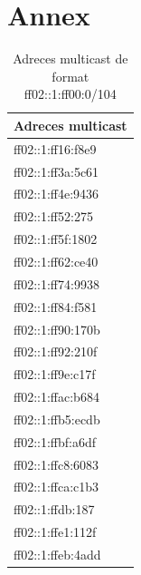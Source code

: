 \documentclass{article}
\begin{document}
\section{Annex}
\begin{table}[!h]
\centering
\begin{tabular}{|C{4cm}|}
\hline
Adreces multicast\\
\hline
ff02::1:ff16:f8e9\\
\hline
ff02::1:ff3a:5c61\\
\hline
ff02::1:ff4e:9436\\
\hline
ff02::1:ff52:275\\
\hline
ff02::1:ff5f:1802\\
\hline
ff02::1:ff62:ce40\\
\hline
ff02::1:ff74:9938\\
\hline
ff02::1:ff84:f581\\
\hline
ff02::1:ff90:170b\\
\hline
ff02::1:ff92:210f\\
\hline
ff02::1:ff9e:c17f\\
\hline
ff02::1:ffac:b684\\
\hline
ff02::1:ffb5:ecdb\\
\hline
ff02::1:ffbf:a6df\\
\hline
ff02::1:ffc8:6083\\
\hline
ff02::1:ffca:c1b3\\
\hline
ff02::1:ffdb:187\\
\hline
ff02::1:ffe1:112f\\
\hline
ff02::1:ffeb:4add\\
\hline
\end{tabular}
\caption{Adreces multicast de format ff02::1:ff00:0/104}
\label{mult:104}
\end{table}
\end{document}
